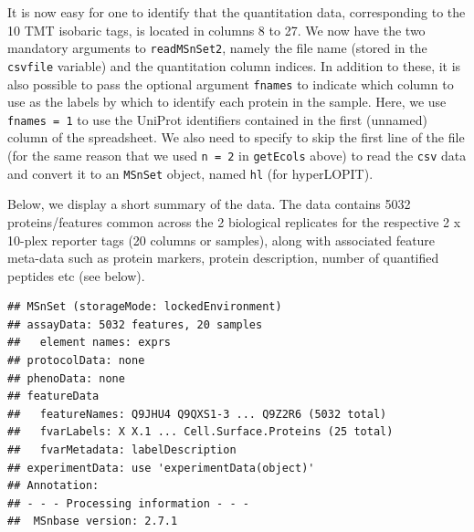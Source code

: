 It is now easy for one to identify that the quantitation data,
corresponding to the 10 TMT isobaric tags, is located in columns 8
to 27. We now have the two mandatory arguments to \texttt{readMSnSet2},
namely the file name (stored in the \texttt{csvfile} variable) and the
quantitation column indices. In addition to these, it is also possible
to pass the optional argument \texttt{fnames} to indicate which column to use
as the labels by which to identify each protein in the sample. Here,
we use \texttt{fnames = 1} to use the UniProt identifiers contained in the
first (unnamed) column of the spreadsheet. We also need to specify to
skip the first line of the file (for the same reason that we used
\texttt{n = 2} in \texttt{getEcols} above) to read the \texttt{csv} data and convert it to an
\texttt{MSnSet} object, named \texttt{hl} (for hyperLOPIT).

\begin{knitrout}
\color{fgcolor}\begin{kframe}
\begin{alltt}
 \hlkwb{<-}   \hlstd{=} \hlopt{:}\hlstd{,}  \hlstd{=} \hlstd{,}  \hlstd{=} \hlstd{)}
\end{alltt}
\end{kframe}
\end{knitrout}

Below, we display a short summary of the data. The data contains
5032 proteins/features common across the 2 biological replicates
for the respective 2 x 10-plex reporter tags (20
columns or samples), along with associated feature meta-data such as
protein markers, protein description, number of quantified peptides
etc (see below).


\begin{knitrout}
\color{fgcolor}\begin{kframe}
\begin{alltt}
\end{alltt}
\begin{verbatim}
## MSnSet (storageMode: lockedEnvironment)
## assayData: 5032 features, 20 samples 
##   element names: exprs 
## protocolData: none
## phenoData: none
## featureData
##   featureNames: Q9JHU4 Q9QXS1-3 ... Q9Z2R6 (5032 total)
##   fvarLabels: X X.1 ... Cell.Surface.Proteins (25 total)
##   fvarMetadata: labelDescription
## experimentData: use 'experimentData(object)'
## Annotation:  
## - - - Processing information - - -
##  MSnbase version: 2.7.1
\end{verbatim}
\end{kframe}
\end{knitrout}


